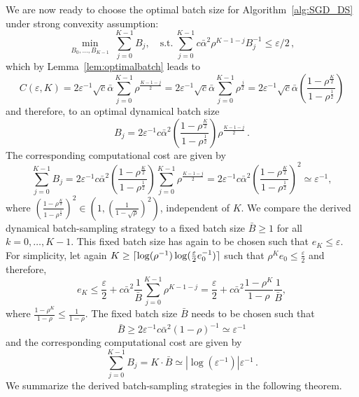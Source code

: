 \documentclass[12pt,openany]{book}
\theoremstyle{definition}
\theoremstyle{definition}
\DeclarePairedDelimiter\ceil{\lceil}{\rceil}
\begin{document}
We are now ready to choose the optimal batch size for Algorithm~\ref{alg:SGD_DS} under strong convexity assumption: 
\[\min_{B_0,\dots,B_{K-1}}\ \sum_{j=0}^{K-1} B_j,\quad \text{s.t.}\ \sum_{j=0}^{K-1}c\bar\alpha^2 \rho^{K-1-j} B_j^{-1} \le \varepsilon/2\, , \]
which by Lemma~\ref{lem:optimalbatch} leads to
\[C(\varepsilon,K) = 2\varepsilon^{-1} \sqrt{c}\bar\alpha \sum_{j=0}^{K-1}\rho^{\frac{K-1-j}2} = 2\varepsilon^{-1} \sqrt{c}\bar\alpha \sum_{j=0}^{K-1}\rho^{\frac{j}2} = 2\varepsilon^{-1} \sqrt{c}\bar\alpha\left(\frac{1-\rho^{\frac{K}2}}{1-\rho^{\frac12}}\right) \]
and therefore, to an optimal dynamical batch size
\begin{equation}\label{eq:optimalbatch}
B_j = 2\varepsilon^{-1} c\bar\alpha^2\left(\frac{1-\rho^{\frac{K}2}}{1-\rho^{\frac12}}\right)\rho^{\frac{K-1-j}2}\,.
\end{equation}
The corresponding computational cost are given by
\[\sum_{j=0}^{K-1} B_j = 2\varepsilon^{-1} c\bar\alpha^2\left(\frac{1-\rho^{\frac{K}2}}{1-\rho^{\frac12}}\right)\sum_{j=0}^{K-1}\rho^{\frac{K-1-j}2} = 2\varepsilon^{-1} c\bar\alpha^2\left(\frac{1-\rho^{\frac{K}2}}{1-\rho^{\frac12}}\right)^2 \simeq \varepsilon^{-1}, \]
where $\left(\frac{1-\rho^{\frac{K}2}}{1-\rho^{\frac12}}\right)^2\in\left(1,\left(\frac{1}{1-\sqrt{\rho}}\right)^2\right)$, independent of $K$. We compare the derived dynamical batch-sampling strategy to a fixed batch size $\bar B\ge 1$ for all $k = 0,\dots,K-1$. This fixed batch size has again to be chosen such that $e_K\le \varepsilon$. For simplicity, let again $K\ge\ceil{\log(\rho^{-1})\log(\frac{\varepsilon}2e_0^{-1})}$ such that $\rho^Ke_0\le\frac{\varepsilon}2$ and therefore,
\[e_K \le \frac{\varepsilon}2 + c\bar\alpha^2 \frac{1}{\bar B} \sum_{j=0}^{K-1} \rho^{K-1-j} = \frac{\varepsilon}2 + c\bar\alpha^2\frac{1-\rho^{K}}{1-\rho} \frac1{\bar B},  \]
where $\frac{1-\rho^{K}}{1-\rho}\le \frac{1}{1-\rho}$. The fixed batch size $\bar B$ needs to be chosen such that
\begin{equation}\label{eq:fixedbatch}
\bar B\ge 2\varepsilon^{-1} c\bar\alpha^2 (1-\rho)^{-1} \simeq \varepsilon^{-1}
\end{equation}
and the corresponding computational cost are given by
\[\sum_{j=0}^{K-1} B_j = K\cdot \bar B \simeq |\log(\varepsilon^{-1})|\varepsilon^{-1}\,. \]
We summarize the derived batch-sampling strategies in the following theorem.
\end{document}
